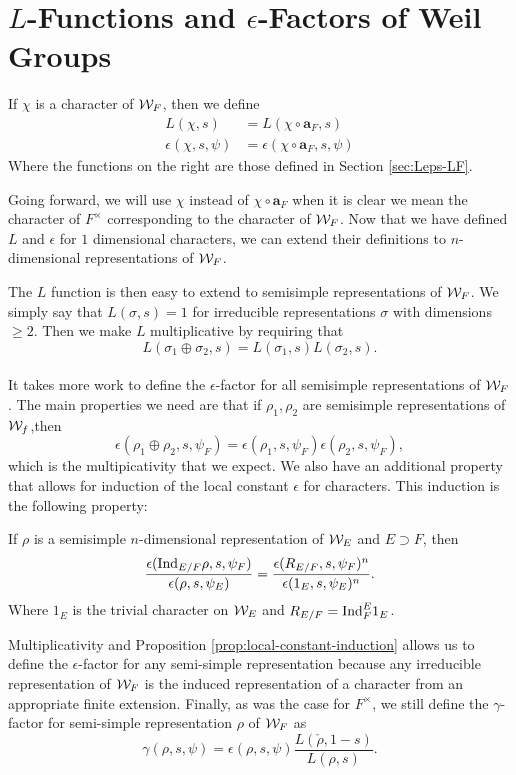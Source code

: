 \section{$L$-Functions and $\epsilon$-Factors of Weil Groups}
\label{sec:Leps-weil-group}
\begin{defn}
  If $\chi$ is a character of $\mathcal{W}_F$, then we define
  \begin{align*}
    L(\chi, s) &= L(\chi \circ \bm{a}_F, s) \\
    \epsilon(\chi, s, \psi) &= \epsilon(\chi \circ \bm{a}_F, s, \psi)
  \end{align*}
  Where the functions on the right are those defined in Section \ref{sec:Leps-LF}.
\end{defn}
Going forward, we will use $\chi$ instead of $\chi \circ \bm{a}_F$ when it is clear we mean the character of $F^\times$ corresponding to the character of $\mathcal{W}_F$.
Now that we have defined $L$ and $\epsilon$ for $1$ dimensional characters, we can extend their definitions to $n$-dimensional representations of $\mathcal{W}_F$.

The $L$ function is then easy to extend to semisimple representations of $\mathcal{W}_F$.
We simply say that $L(\sigma,s) = 1$ for irreducible representations $\sigma$ with dimensions $\geq 2$.
Then we make $L$ multiplicative by requiring that
\[L(\sigma_1 \oplus \sigma_2,s) = L(\sigma_1,s)L(\sigma_2,s).\]
\\

It takes more work to define the $\epsilon$-factor for all semisimple representations of $\mathcal{W}_F$.
The main properties we need are that if $\rho_1, \rho_2$ are semisimple representations of $\mathcal{W}_f$,then 
\[\epsilon(\rho_1 \oplus \rho_2,s,\psi_F) = \epsilon(\rho_1,s,\psi_F)\epsilon(\rho_2,s,\psi_F),\]
which is the multipicativity that we expect.
We also have an additional property that allows for induction of the local constant $\epsilon$ for characters.
This induction is the following property:

\begin{prop}\label{prop:local-constant-induction}
  If $\rho$ is a semisimple $n$-dimensional representation of $\mathcal{W}_E$ and $E\supset F$, then
  \[\frac{\epsilon(\textrm{Ind}_{E/F} \rho, s, \psi_F)}{\epsilon(\rho,s,\psi_E)} = \frac{\epsilon(R_{E/F},s,\psi_F)^n}{\epsilon(1_E,s,\psi_E)^n}.\]
  Where $1_E$ is the trivial character on $\mathcal{W}_E$ and $R_{E/F} = \textrm{Ind}^E_F 1_E$.
\end{prop}
Multiplicativity and Proposition \ref{prop:local-constant-induction} allows us to define the $\epsilon$-factor for any semi-simple representation because any irreducible representation of $\mathcal{W}_F$ is the induced representation of a character from an appropriate finite extension.
Finally, as was the case for $F^\times$, we still define the $\gamma$-factor for semi-simple representation $\rho$ of $\mathcal{W}_F$ as
\[\gamma(\rho, s ,\psi) = \epsilon(\rho, s, \psi) \frac{L(\check{\rho},1-s)}{L(\rho,s)}.\]

